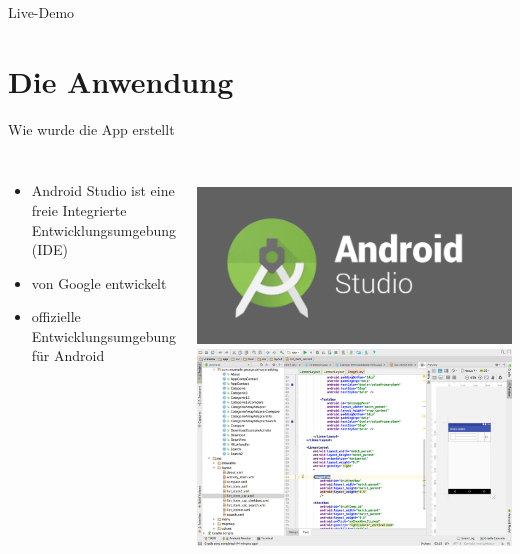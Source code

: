 \documentclass[compress,t]{beamer}
\begin{document}
\begin{frame}{Live-Demo}

\end{frame}

\section{Die Anwendung}

\begin{frame}[fragile]{Wie wurde die App erstellt}

    \begin{columns}
        \begin{itemize}
            \item Android Studio ist eine freie Integrierte Entwicklungsumgebung (IDE)
            \item von Google entwickelt
            \item offizielle Entwicklungsumgebung für Android
        \end{itemize}

        \centering
        \\
        \includegraphics[width=1.0\textwidth]{img/android-studio-logo.png}\\
        \includegraphics[width=1.0\textwidth]{img/android_studio_screan.png}
    \end{columns}

\end{frame}
\end{document}
